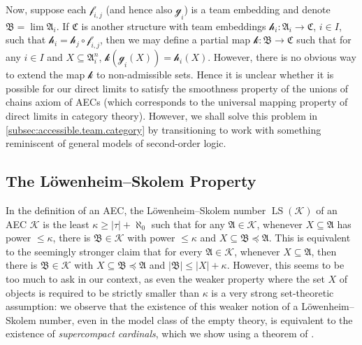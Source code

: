 \documentclass[a4paper]{amsart}
\theoremstyle{definition}
\theoremstyle{remark}
\newcommand{\A}{\mathcal{A}}
\newcommand{\B}{\mathcal{B}}
\newcommand{\C}{\mathcal{C}}
\newcommand{\K}{\mathcal{K}}
\DeclareMathOperator{\LS}{LS}
\theoremstyle{definition}
\renewcommand{\A}{\mathfrak{A}}
\renewcommand{\B}{\mathfrak{B}}
\renewcommand{\C}{\mathfrak{C}}
\newcommand{\f}{\mathcal{f}}
\newcommand{\g}{\mathcal{g}}
\newcommand{\h}{\mathcal{h}}
\begin{document}
Now, suppose each $\f_{i,j}$ (and hence also $\g_i$) is a team embedding and denote $\B=\lim\A_i$. If $\C$ is another structure with team embeddings $\h_i\colon\A_i\to\C$, $i\in I$, such that $\h_i = \h_j\circ\f_{i,j}$, then we may define a partial map $\mathcal k\colon\B\to\C$ such that for any $i\in I$ and $X\subseteq\A_i^n$, $\mathcal k(\g_i(X)) = \h_i(X)$. However, there is no obvious way to extend the map $\mathcal k$ to non-admissible sets. Hence it is unclear whether it is possible for our direct limits to satisfy the smoothness property of the unions of chains axiom of AECs (which corresponds to the universal mapping property of direct limits in category theory). However, we shall solve this problem in \cref{subsec:accessible.team.category} by transitioning to work with something reminiscent of general models of second-order logic.







\subsection{The Löwenheim--Skolem Property}\label{subsec:LoSk}

In the definition of an AEC, the Löwen\-heim--Skolem number $\LS(\K)$ of an AEC $\K$ is the least $\kappa\geq|\tau|+\aleph_0$ such that for any $\A\in\K$, whenever $X\subseteq\A$ has power $\leq\kappa$, there is $\B\in\K$ with power $\leq\kappa$ and $X\subseteq\B\preceq\A$. This is equivalent to the seemingly stronger claim that for every $\A\in\K$, whenever $X\subseteq\A$, then there is $\B\in\K$ with $X\subseteq\B\preceq\A$ and $|\B|\leq|X|+\kappa$. However, this seems to be too much to ask in our context, as even the weaker property where the set $X$ of objects is required to be strictly smaller than $\kappa$ is a very strong set-theoretic assumption: we observe that the existence of this weaker notion of a Löwenheim--Skolem number, even in the model class of the empty theory, is equivalent to the existence of \emph{supercompact cardinals}, which we show using a theorem of \textcite{MR0295904}.
\end{document}
